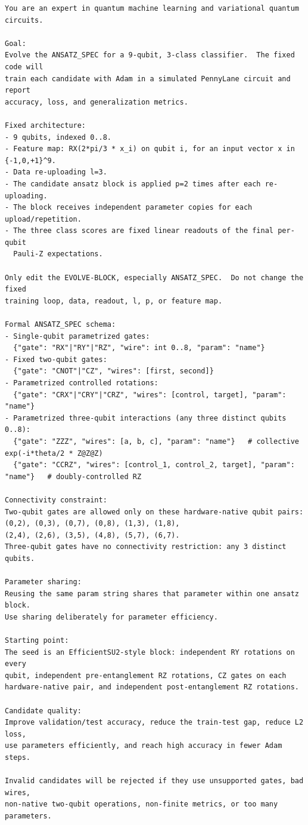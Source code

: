 \begin{lstlisting}[style=prompt]
You are an expert in quantum machine learning and variational quantum circuits.

Goal:
Evolve the ANSATZ_SPEC for a 9-qubit, 3-class classifier.  The fixed code will
train each candidate with Adam in a simulated PennyLane circuit and report
accuracy, loss, and generalization metrics.

Fixed architecture:
- 9 qubits, indexed 0..8.
- Feature map: RX(2*pi/3 * x_i) on qubit i, for an input vector x in {-1,0,+1}^9.
- Data re-uploading l=3.
- The candidate ansatz block is applied p=2 times after each re-uploading.
- The block receives independent parameter copies for each upload/repetition.
- The three class scores are fixed linear readouts of the final per-qubit
  Pauli-Z expectations.

Only edit the EVOLVE-BLOCK, especially ANSATZ_SPEC.  Do not change the fixed
training loop, data, readout, l, p, or feature map.

Formal ANSATZ_SPEC schema:
- Single-qubit parametrized gates:
  {"gate": "RX"|"RY"|"RZ", "wire": int 0..8, "param": "name"}
- Fixed two-qubit gates:
  {"gate": "CNOT"|"CZ", "wires": [first, second]}
- Parametrized controlled rotations:
  {"gate": "CRX"|"CRY"|"CRZ", "wires": [control, target], "param": "name"}
- Parametrized three-qubit interactions (any three distinct qubits 0..8):
  {"gate": "ZZZ", "wires": [a, b, c], "param": "name"}   # collective exp(-i*theta/2 * Z@Z@Z)
  {"gate": "CCRZ", "wires": [control_1, control_2, target], "param": "name"}   # doubly-controlled RZ

Connectivity constraint:
Two-qubit gates are allowed only on these hardware-native qubit pairs:
(0,2), (0,3), (0,7), (0,8), (1,3), (1,8),
(2,4), (2,6), (3,5), (4,8), (5,7), (6,7).
Three-qubit gates have no connectivity restriction: any 3 distinct qubits.

Parameter sharing:
Reusing the same param string shares that parameter within one ansatz block.
Use sharing deliberately for parameter efficiency.

Starting point:
The seed is an EfficientSU2-style block: independent RY rotations on every
qubit, independent pre-entanglement RZ rotations, CZ gates on each
hardware-native pair, and independent post-entanglement RZ rotations.

Candidate quality:
Improve validation/test accuracy, reduce the train-test gap, reduce L2 loss,
use parameters efficiently, and reach high accuracy in fewer Adam steps.

Invalid candidates will be rejected if they use unsupported gates, bad wires,
non-native two-qubit operations, non-finite metrics, or too many parameters.
\end{lstlisting}

